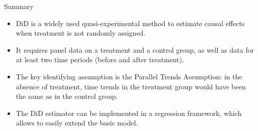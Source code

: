 \documentclass[9pt,aspectratio=169]{beamer}
\begin{document}
\begin{frame}{Summary}
\begin{itemize}
    \item DiD is a widely used quasi-experimental method to estimate causal effects when treatment is not randomly assigned.
    \item It requires \alert{panel data} on a treatment and a control group, as well as data for at least two time periods (before and after treatment).
    \item The key identifying assumption is the \alert{Parallel Trends Assumption}: in the absence of treatment, time trends in the treatment group would have been the same as in the control group.
    \item The DiD estimator can be implemented in a regression framework, which allows to easily extend the basic model.    
\end{itemize}
\end{frame}
\end{document}
